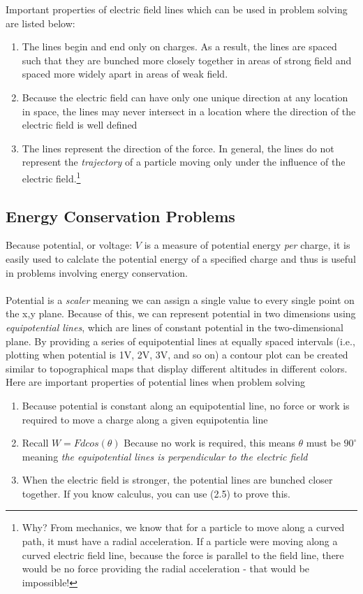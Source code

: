 Important properties of electric field lines which can be used in problem solving are listed below:
\begin{enumerate}
    \item The lines begin and end only on charges. As a result, the lines are spaced such that they are bunched more closely together in areas of strong field and spaced more widely apart in areas of weak field.
    \item Because the electric field can have only one unique direction at any location in space, the lines may never intersect in a location where the direction of the electric field is well defined
    \item The lines represent the direction of the force. In general, the lines do not represent the \emph{trajectory} of a particle moving only under the influence of the electric field.\footnote{Why? From mechanics, we know that for a particle to move along a curved path, it must have a radial acceleration. If a particle were moving along a curved electric field line, because the force is parallel to the field line, there would be no force providing the radial acceleration - that would be impossible!}
\end{enumerate}

\newpage
\subsection{Energy Conservation Problems}
Because potential, or voltage: $V$ is a measure of potential energy \emph{per} charge, it is easily used to calclate the potential energy of a specified charge and thus is useful in problems involving energy conservation.
\\\\
Potential is a \emph{scaler} meaning we can assign a single value to every single point on the x,y plane. Because of this, we can represent potential in two dimensions using \emph{equipotential lines}, which are lines of constant potential in the two-dimensional plane. By providing a series of equipotential lines at equally spaced intervals (i.e., plotting when potential is 1V, 2V, 3V, and so on) a contour plot can be created similar to topographical maps that display different altitudes in different colors. Here are important properties of potential lines when problem solving
\begin{enumerate}
    \item Because potential is constant along an equipotential line, no force or work is required to move a charge along a given equipotentia line
    \item Recall $W=Fdcos(\theta)$ Because no work is required, this means $\theta$ must be $90^\circ$ meaning \emph{the equipotential lines is perpendicular to the electric field}
    \item When the electric field is stronger, the potential lines are bunched closer together. If you know calculus, you can use (2.5) to prove this.
\end{enumerate}

